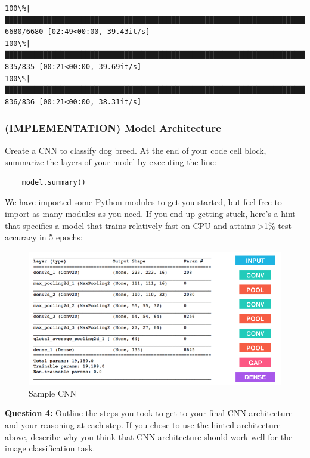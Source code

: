 \documentclass[11pt]{article}
\makeatletter
\def\maxwidth{\ifdim\Gin@nat@width>\linewidth\linewidth
    \else\Gin@nat@width\fi}
\let\Oldincludegraphics\includegraphics
\renewcommand{\includegraphics}[1]{\Oldincludegraphics[width=.8\maxwidth]{#1}}
\makeatother
\begin{document}
    \begin{Verbatim}[commandchars=\\\{\}]
100\%|██████████████████████████████████████████████████████████████████████████████| 6680/6680 [02:49<00:00, 39.43it/s]
100\%|████████████████████████████████████████████████████████████████████████████████| 835/835 [00:21<00:00, 39.69it/s]
100\%|████████████████████████████████████████████████████████████████████████████████| 836/836 [00:21<00:00, 38.31it/s]

    \end{Verbatim}

    \subsubsection{(IMPLEMENTATION) Model
Architecture}\label{implementation-model-architecture}

Create a CNN to classify dog breed. At the end of your code cell block,
summarize the layers of your model by executing the line:

\begin{verbatim}
    model.summary()
\end{verbatim}

We have imported some Python modules to get you started, but feel free
to import as many modules as you need. If you end up getting stuck,
here's a hint that specifies a model that trains relatively fast on CPU
and attains \textgreater{}1\% test accuracy in 5 epochs:

\begin{figure}
\centering
\includegraphics{images/sample_cnn.png}
\caption{Sample CNN}
\end{figure}

\textbf{Question 4:} Outline the steps you took to get to your final CNN
architecture and your reasoning at each step. If you chose to use the
hinted architecture above, describe why you think that CNN architecture
should work well for the image classification task.
\end{document}

